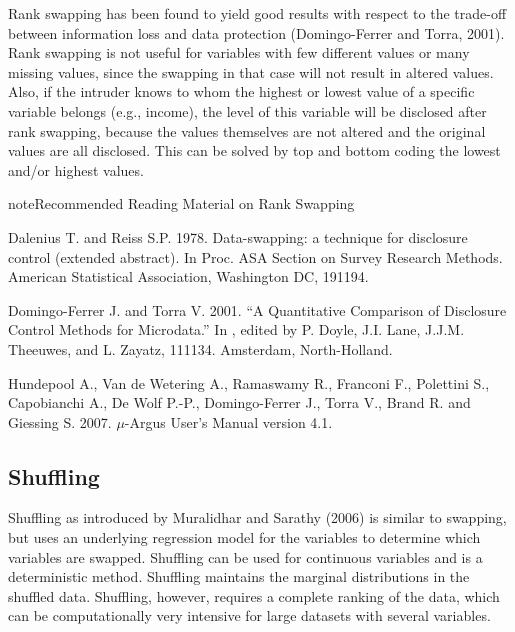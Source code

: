 \documentclass[letterpaper,10pt,english]{sphinxmanual}
\begin{document}
Rank swapping has been found to yield good results with respect to the
trade-off between information loss and data protection (Domingo-Ferrer
and Torra, 2001). Rank swapping is not useful for variables with few
different values or many missing values, since the swapping in that case
will not result in altered values. Also, if the intruder knows to whom
the highest or lowest value of a specific variable belongs (e.g.,
income), the level of this variable will be disclosed after rank
swapping, because the values themselves are not altered and the original
values are all disclosed. This can be solved by top and bottom coding
the lowest and/or highest values.

\begin{sphinxadmonition}{note}{Recommended Reading Material on Rank Swapping}

Dalenius T. and Reiss S.P. 1978. Data-swapping: a technique for
disclosure control (extended abstract). In Proc. ASA Section on Survey
Research Methods. American Statistical Association, Washington DC,
191\textendash{}194.

Domingo-Ferrer J. and Torra V. 2001. “A Quantitative Comparison of
Disclosure Control Methods for Microdata.” In , edited by P. Doyle, J.I. Lane, J.J.M. Theeuwes,
and L. Zayatz, 111\textendash{}134. Amsterdam, North-Holland.

Hundepool A., Van de Wetering A., Ramaswamy R., Franconi F., Polettini
S., Capobianchi A., De Wolf P.-P., Domingo-Ferrer J., Torra V., Brand R.
and Giessing S. 2007. \(\mu\)-Argus User’s Manual version 4.1.
\end{sphinxadmonition}


\subsection{Shuffling}
\label{\detokenize{anon_methods:shuffling}}
Shuffling as introduced by Muralidhar and Sarathy (2006) is similar to
swapping, but uses an underlying regression model for the variables to
determine which variables are swapped. Shuffling can be used for
continuous variables and is a deterministic method. Shuffling maintains
the marginal distributions in the shuffled data. Shuffling, however,
requires a complete ranking of the data, which can be computationally
very intensive for large datasets with several variables.
\end{document}
